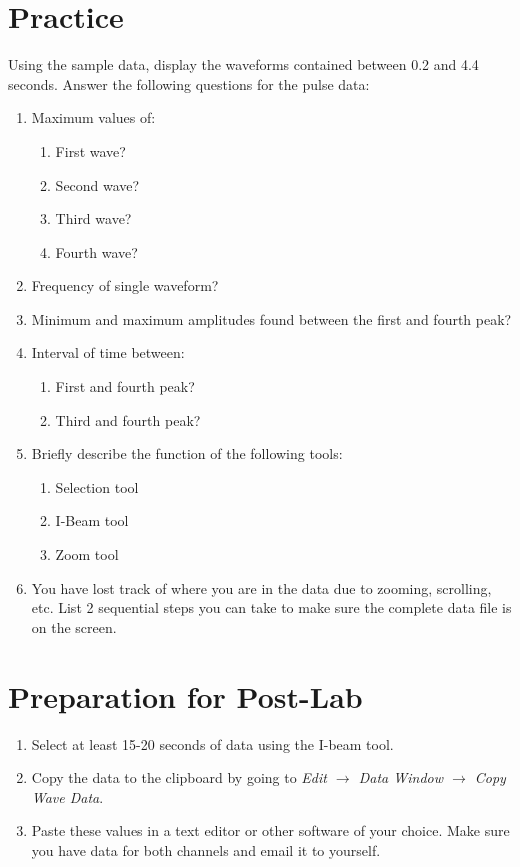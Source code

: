 \documentclass{article}
\begin{document}
\section*{Practice}
Using the sample data, display the waveforms contained between 0.2 and 4.4 seconds. Answer the following questions for the pulse data:
		\begin{enumerate}
			\item Maximum values of:
				\begin{enumerate}
					\item First wave?
					\item Second wave?
					\item Third wave?
					\item Fourth wave?
				\end{enumerate}
			\item Frequency of single waveform?
			\item Minimum and maximum amplitudes found between the first and fourth peak?
			\item Interval of time between:
				\begin{enumerate}
					\item First and fourth peak?
					\item Third and fourth peak?
				\end{enumerate}
			\item Briefly describe the function of the following tools:
				\begin{enumerate}
					\item Selection tool
					\item I-Beam tool
					\item Zoom tool
				\end{enumerate}
			\item You have lost track of where you are in the data due to zooming, scrolling, etc. List 2 sequential steps you can take to make sure the complete data file is on the screen.
		\end{enumerate}
\section*{Preparation for Post-Lab}
\begin{enumerate}
	\item Select at least 15-20 seconds of data using the I-beam tool.
	\item Copy the data to the clipboard by going to \textit{Edit $\rightarrow$ Data Window $\rightarrow$ Copy Wave Data}.
	\item Paste these values in a text editor or other software of your choice. Make sure you have data for both channels and email it to yourself.
\end{enumerate} 
\end{document}
